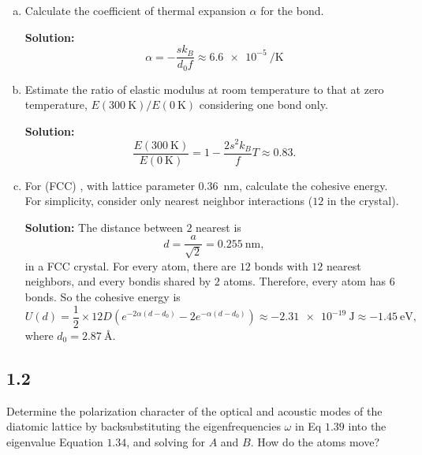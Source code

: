 \documentclass[12pt]{article}
\begin{document}
\begin{enumerate}[(a)]
	\item Calculate the coefficient of thermal expansion $\alpha$ for the bond.

	      \textbf{Solution:}
	      \begin{equation}
		      \alpha = -\frac{s k_B}{d_0 f} \approx \SI{6.6e-5}{\per\kelvin}
	      \end{equation}

	\item Estimate the ratio of elastic modulus at room temperature to that
	      at zero temperature, $E(\SI{300}{\kelvin}) / E(\SI{0}{\kelvin})$ considering one bond only.

	      \textbf{Solution:}
	      \begin{equation}
		      \frac{E(\SI{300}{\kelvin})}{E(\SI{0}{\kelvin})} = 1 - \frac{2 s^2 k_B}{f} T \approx 0.83.
	      \end{equation}

	\item For (FCC) , with lattice parameter \SI{0.36}{\nano\meter}, calculate the cohesive energy.
	      For simplicity, consider only nearest neighbor interactions ($12$ in the crystal).

	      \textbf{Solution:}
	      The distance between $2$ nearest  is
	      \begin{equation}
		      d = \frac{a}{\sqrt{2}} = \SI{0.255}{\nano\meter},
	      \end{equation}
	      in a FCC crystal. For every atom, there are $12$ bonds with $12$ nearest neighbors, and every bondis shared by
	      $2$ atoms. Therefore, every atom has $6$ bonds. So the cohesive energy is
	      \begin{equation}
		      U(d) = \frac{1}{2} \times 12 D(e^{-2\alpha(d - d_0)} - 2e^{-\alpha (d - d_0)})
		      \approx \SI{-2.31e-19}{\joule} \approx \SI{-1.45}{\electronvolt},
	      \end{equation}
	      where $d_0 = \SI{2.87}{\angstrom}$.\cite{PhysRev.114.687}
\end{enumerate}

\subsection{1.2}
Determine the polarization character of the optical and acoustic modes of the diatomic
lattice by backsubstituting the eigenfrequencies $\omega$ in Eq $1.39$ into the eigenvalue
Equation $1.34$, and solving for $A$ and $B$. How do the atoms move?
\end{document}
